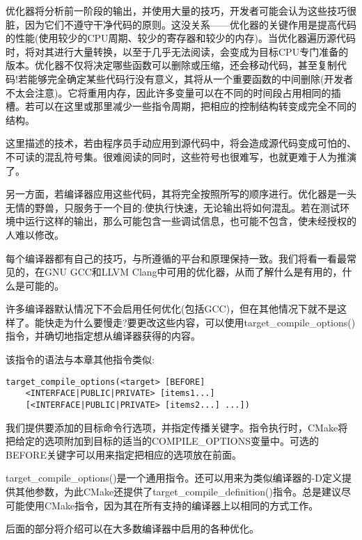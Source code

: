 
优化器将分析前一阶段的输出，并使用大量的技巧，开发者可能会认为这些技巧很脏，因为它们不遵守干净代码的原则。这没关系——优化器的关键作用是提高代码的性能(使用较少的CPU周期、较少的寄存器和较少的内存)。当优化器遍历源代码时，将对其进行大量转换，以至于几乎无法阅读，会变成为目标CPU专门准备的版本。优化器不仅将决定哪些函数可以删除或压缩，还会移动代码，甚至复制代码!若能够完全确定某些代码行没有意义，其将从一个重要函数的中间删除(开发者不太会注意)。它将重用内存，因此许多变量可以在不同的时间段占用相同的插槽。若可以在这里或那里减少一些指令周期，把相应的控制结构转变成完全不同的结构。

这里描述的技术，若由程序员手动应用到源代码中，将会造成源代码变成可怕的、不可读的混乱符号集。很难阅读的同时，这些符号也很难写，也就更难于人为推演了。

另一方面，若编译器应用这些代码，其将完全按照所写的顺序进行。优化器是一头无情的野兽，只服务于一个目的:使执行快速，无论输出将如何混乱。若在测试环境中运行这样的输出，那么可能包含一些调试信息，也可能不包含，使未经授权的人难以修改。

每个编译器都有自己的技巧，与所遵循的平台和原理保持一致。我们将看一看最常见的，在GNU GCC和LLVM Clang中可用的优化器，从而了解什么是有用的，什么是可能的。

许多编译器默认情况下不会启用任何优化(包括GCC)，但在其他情况下就不是这样了。能快走为什么要慢走?要更改这些内容，可以使用target\_compile\_options()指令，并确切地指定想从编译器获得的内容。

该指令的语法与本章其他指令类似:

\begin{lstlisting}[style=styleCMake]
target_compile_options(<target> [BEFORE]
	<INTERFACE|PUBLIC|PRIVATE> [items1...]
	[<INTERFACE|PUBLIC|PRIVATE> [items2...] ...])
\end{lstlisting}  

我们提供要添加的目标命令行选项，并指定传播关键字。指令执行时，CMake将把给定的选项附加到目标的适当的COMPILE\_OPTIONS变量中。可选的BEFORE关键字可以用来指定把相应的选项放在前面。

\begin{tcolorbox}[colback=blue!5!white,colframe=blue!75!black,title=重要的Note]
target\_compile\_options()是一个通用指令。还可以用来为类似编译器的-D定义提供其他参数，为此CMake还提供了target\_compile\_definition()指令。总是建议尽可能使用CMake指令，因为其在所有支持的编译器上以相同的方式工作。
\end{tcolorbox}

后面的部分将介绍可以在大多数编译器中启用的各种优化。

